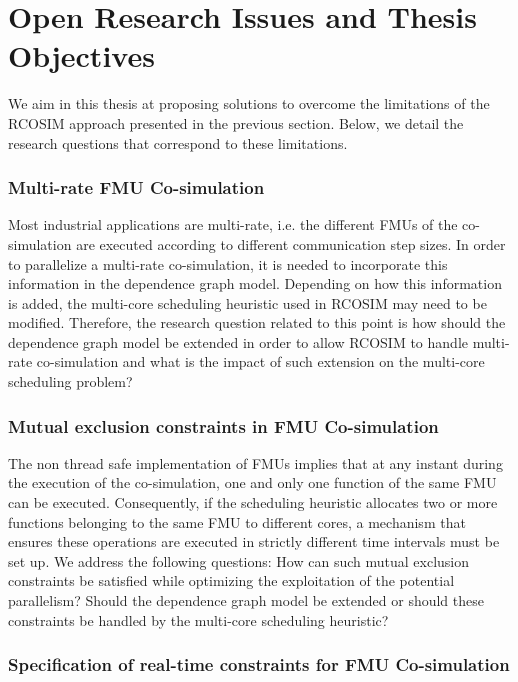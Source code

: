 \section{Open Research Issues and Thesis Objectives}

We aim in this thesis at proposing solutions to overcome the limitations of the RCOSIM approach presented in the previous section. Below, we detail the research questions that correspond to these limitations.

\subsubsection{Multi-rate FMU Co-simulation}

Most industrial applications are multi-rate, i.e. the different FMUs of the co-simulation are executed according to different communication step sizes. In order to parallelize a multi-rate co-simulation, it is needed to incorporate this information in the dependence graph model. Depending on how this information is added, the multi-core scheduling heuristic used in RCOSIM may need to be modified. Therefore, the research question related to this point is how should the dependence graph model be extended in order to allow RCOSIM to handle multi-rate co-simulation and what is the impact of such extension on the multi-core scheduling problem?

\subsubsection{Mutual exclusion constraints in FMU Co-simulation}

The non thread safe implementation of FMUs implies that at any instant during the execution of the co-simulation, one and only one function of the same FMU can be executed. Consequently, if the scheduling heuristic allocates two or more functions belonging to the same FMU to different cores, a mechanism that ensures these operations are executed in strictly different time intervals must be set up. We address the following questions: How can such mutual exclusion constraints be satisfied while optimizing the exploitation of the potential parallelism? Should the dependence graph model be extended or should these constraints be handled by the multi-core scheduling heuristic?

\subsubsection{Specification of real-time constraints for FMU Co-simulation}

